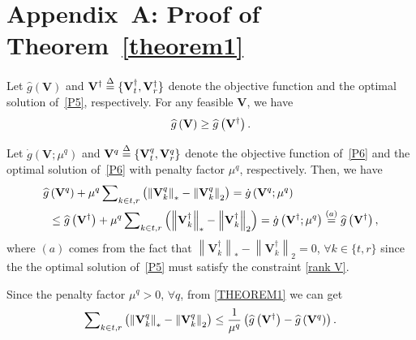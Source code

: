 \documentclass[12pt, draftclsnofoot, onecolumn]{IEEEtran}
\begin{document}
\section*{Appendix~A: Proof of Theorem~\ref{theorem1}} \label{Appendix:A}
\renewcommand{\theequation}{A.\arabic{equation}}
\setcounter{equation}{0}
Let $\widehat{g}\left(\mathbf{V}\right)$ and $\mathbf{V}^\dag\buildrel \Delta \over=\{\mathbf{V}^\dag_t,\mathbf{V}^\dag_r\}$ denote the objective function and the optimal solution of~\eqref{P5}, respectively. For any feasible $\mathbf{V}$, we have\vspace{-0.2cm}
\begin{equation}\label{THEOREM}
\begin{aligned}
\widehat{g}\left(\mathbf{V}\right) \ge \widehat{g}\left(\mathbf{V}^\dag\right).
\end{aligned}\vspace{-0.2cm}
\end{equation}

Let $\dot{g}\left(\mathbf{V};\mu^q\right)$ and $\mathbf{V}^q\buildrel \Delta \over=\{\mathbf{V}^q_t,\mathbf{V}^q_r\}$ denote the objective function of~\eqref{P6} and the optimal solution of~\eqref{P6} with penalty factor $\mu^q$, respectively. Then, we have 
\begin{equation}\label{THEOREM1}
\begin{aligned}
\widehat{g}&\left(\mathbf{V}^q\right)+\mu^q\sum\nolimits_{k\in{t,r}}\left(\left\|{\mathbf{V}}_k^q\right\|_*-\left\|{\mathbf{V}}_k^q\right\|_2\right)=\dot{g}\left(\mathbf{V}^q;\mu^q\right)\\
&\le \widehat{g}\left(\mathbf{V}^\dag\right)+\mu^q\sum\nolimits_{k\in{t,r}}\left(\left\|{\mathbf{V}}_k^\dag\right\|_*-\left\|{\mathbf{V}}_k^\dag\right\|_2\right) =\dot{g}\left(\mathbf{V}^\dag;\mu^q\right)\buildrel (a) \over=\widehat{g}\left(\mathbf{V}^\dag\right),
\end{aligned}
\end{equation}
where $(a)$ comes from the fact that $\left\|{\mathbf{V}}_k^\dag\right\|_*-\left\|{\mathbf{V}}_k^\dag\right\|_2=0$, $\forall k \in\{t,r\}$ since the the optimal solution of~\eqref{P5} must satisfy the constraint \eqref{rank V}.

Since the penalty factor $\mu^q>0$, $\forall q$, from \eqref{THEOREM1} we can get\vspace{-0.1cm}
\begin{equation}\label{THEOREM2}
\begin{aligned}
\sum\nolimits_{k\in{t,r}}\left(\left\|{\mathbf{V}}_k^q\right\|_*-\left\|{\mathbf{V}}_k^q\right\|_2\right) \le \frac{1}{\mu^q}\left(\widehat{g}\left(\mathbf{V}^\dag\right)-\widehat{g}\left(\mathbf{V}^q\right)\right).
\end{aligned}\vspace{-0.1cm}
\end{equation}
\end{document}

